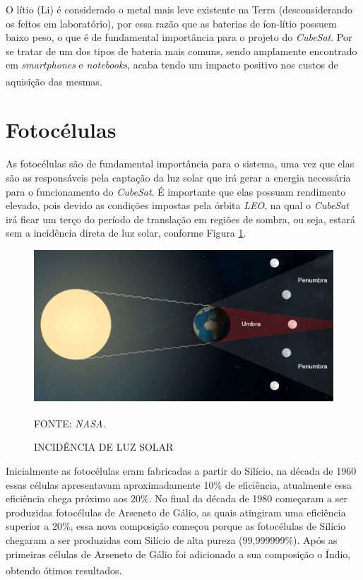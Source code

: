 \documentclass[
	12pt,				%
	openright,			%
	oneside,			%
	a4paper,			%
	english,			%
	french,				%
	spanish,			%
	brazil,				%
	oldfontcommands
	]{abntex2}
\begin{document}
	O lítio (Li) é considerado o metal mais leve existente na Terra (desconsiderando os feitos em laboratório), por essa razão que as baterias de íon-lítio possuem baixo peso, o que é de fundamental importância para o projeto do \textit{CubeSat}. Por se tratar de um dos tipos de bateria mais comuns, sendo amplamente encontrado em \textit{smartphones} e \textit{notebooks}, acaba tendo um impacto positivo nos custos de aquisição das mesmas.\textsuperscript{\cite{TecMundo}}
	
\section[Fotocélulas]{Fotocélulas} \label{Cap_Cell}

	As fotocélulas são de fundamental importância para o sistema, uma vez que elas são as responsáveis pela captação da luz solar que irá gerar a energia necessária para o funcionamento do \textit{CubeSat}. É importante que elas possuam rendimento elevado, pois devido as condições impostas pela órbita \textit{LEO}, na qual o \textit{CubeSat} irá ficar um terço do período de translação em regiões de sombra, ou seja, estará sem a incidência direta de luz solar, conforme Figura \ref{Fig_Cone_Solar}.
	
	\begin{figure}[th]
		\caption{INCIDÊNCIA DE LUZ SOLAR}
		\label{Fig_Cone_Solar}
		\centering
		\includegraphics[width=0.7\linewidth]{./figs/cone_solar}
			
		\begin{small}
			FONTE: \textit{NASA}.\textsuperscript{\cite{NASA3}}
		\end{small}		
	\end{figure}
	
	Inicialmente as fotocélulas eram fabricadas a partir do Silício, na década de 1960 essas células apresentavam aproximadamente 10\% de eficiência, atualmente essa eficiência chega próximo aos 20\%. No final da década de 1980 começaram a ser produzidas fotocélulas de Arseneto de Gálio, as quais atingiram uma eficiência superior a 20\%, essa nova composição começou porque as fotocélulas de Silício chegaram a ser produzidas com Silício de alta pureza (99,999999\%). Após as primeiras células de Arseneto de Gálio foi adicionado a sua composição o Índio, obtendo ótimos resultados.\textsuperscript{\cite{Fatemi}}
	
\end{document}
